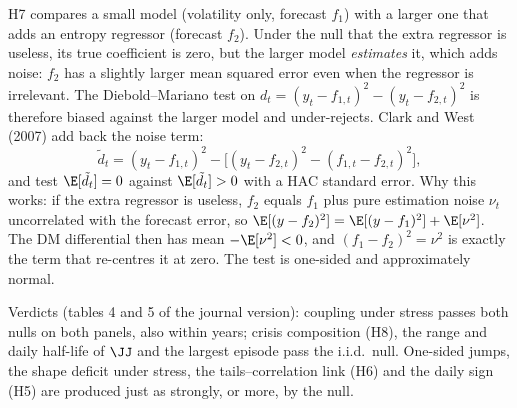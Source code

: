 H7 compares a small model (volatility only, forecast $f_1$) with a larger one
that adds an entropy regressor (forecast $f_2$). Under the null that the extra
regressor is useless, its true coefficient is zero, but the larger model
\emph{estimates} it, which adds noise: $f_2$ has a slightly larger mean squared
error even when the regressor is irrelevant. The Diebold--Mariano test on
$d_t=(y_t-f_{1,t})^2-(y_t-f_{2,t})^2$ is therefore biased against the larger
model and under-rejects. Clark and West (2007) add back the noise term:
\[
\tilde d_t=(y_t-f_{1,t})^2-\bigl[(y_t-f_{2,t})^2-(f_{1,t}-f_{2,t})^2\bigr],
\]
and test $\E[\tilde d_t]=0$ against $\E[\tilde d_t]>0$ with a HAC standard
error. Why this works: if the extra regressor is useless, $f_2$ equals $f_1$
plus pure estimation noise $\nu_t$ uncorrelated with the forecast error, so
$\E[(y-f_2)^2]=\E[(y-f_1)^2]+\E[\nu^2]$. The DM differential then has mean
$-\E[\nu^2]<0$, and $(f_1-f_2)^2=\nu^2$ is exactly the term that re-centres it
at zero. The test is one-sided and approximately normal.

\begin{papier}
Verdicts (tables 4 and 5 of the journal version): coupling under stress
passes both nulls on both panels, also within years; crisis composition (H8),
the range and daily half-life of $\JJ$ and the largest episode pass the
i.i.d.\ null. One-sided jumps, the shape deficit under stress, the
tails--correlation link (H6) and the daily sign (H5) are produced just as
strongly, or more, by the null.
\end{papier}

